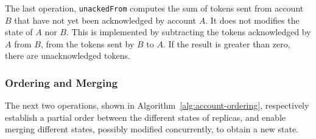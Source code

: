 \documentclass[9pt, oneside]{article}   	%
\begin{document}
The last operation, \texttt{unackedFrom} computes the sum of tokens sent from account $B$ that have not yet been acknowledged by account $A$. It does not modifies the state of $A$ nor $B$. This is implemented by subtracting the tokens acknowledged by $A$ from $B$, from the tokens sent by $B$ to $A$. If the result is greater than zero, there are unacknowledged tokens.

\subsubsection{Ordering and Merging}
\label{sec:account:ordering-merging}

The next two operations, shown in Algorithm~\ref{alg:account-ordering}, respectively establish a partial order between the different states of replicas, and enable merging different states, possibly modified concurrently, to obtain a new state.
\end{document}
